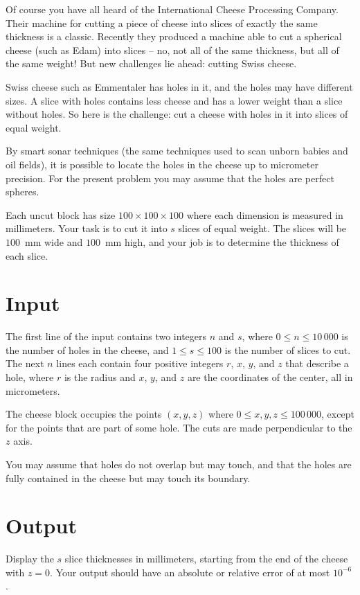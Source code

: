 
%
Of course you have all heard of the International Cheese Processing Company. Their machine for cutting a piece of cheese into slices of exactly the same thickness is a classic. Recently they produced a machine able to cut a spherical cheese (such as Edam) into slices -- no, not all of the same thickness, but all of the same weight! But new challenges lie ahead: cutting Swiss cheese.

Swiss cheese such as Emmentaler has holes in it, and the holes may have different sizes. A slice with holes contains less cheese and has a lower weight than a slice without holes. So here is the challenge: cut a cheese with holes in it into slices of equal weight.

By smart sonar techniques (the same techniques used to scan unborn babies and oil fields), it is possible to locate the holes in the cheese up to micrometer precision. For the present problem you may assume that the holes are perfect spheres.

Each
uncut block has size $100 \times 100 \times 100$ where each dimension is measured in millimeters.  Your task is to cut
it into $s$ slices of equal weight. The slices will be $100$~mm
wide and $100$~mm high, and your job is to determine the thickness of each
slice. 


\section*{Input}

The first line of the input contains two integers $n$ and
$s$, where $0 \leq n \leq 10\,000$ is the number of holes in the
cheese, and $1 \le s \le 100$ is the number of slices to cut. The next
$n$ lines each contain four positive integers $r$, $x$, $y$, and $z$ that describe a
hole, where $r$ is the radius and $x$, $y$, and $z$ are
the coordinates of the center, all in micrometers.  

The cheese block occupies the points $(x,y,z)$ where $0 \le x,y,z \le
100\,000$, except for the points that are part of some hole.  The cuts are made perpendicular to the $z$ axis.

You may assume that holes do not overlap but may touch, and that the holes are fully contained in the cheese but
may touch its boundary.


\section*{Output}

Display the $s$ slice thicknesses in millimeters,
starting from the end of the cheese with $z=0$.
Your output should have an absolute or relative
error of at most $10^{-6}$.
